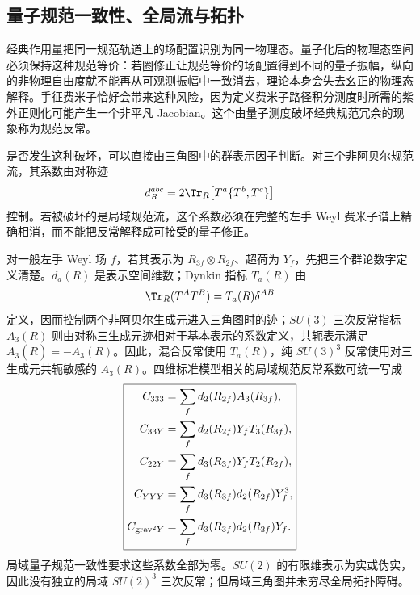 

\subsection{量子规范一致性、全局流与拓扑}\label{subsec:sm-gauge-anomaly-cancellation-dp32}

经典作用量把同一规范轨道上的场配置识别为同一物理态。量子化后的物理态空间必须保持这种规范等价：若圈修正让规范等价的场配置得到不同的量子振幅，纵向的非物理自由度就不能再从可观测振幅中一致消去，理论本身会失去幺正的物理态解释。手征费米子恰好会带来这种风险，因为定义费米子路径积分测度时所需的紫外正则化可能产生一个非平凡 Jacobian。这个由量子测度破坏经典规范冗余的现象称为规范反常。

\begin{definition}[手征规范反常的群论系数]
是否发生这种破坏，可以直接由三角图中的群表示因子判断。对三个非阿贝尔规范流，其系数由对称迹
\begin{equation*}
 d_R^{abc}=2\Tr_R\!\left[T^a\{T^b,T^c\}\right]
\end{equation*}
控制。若被破坏的是局域规范流，这个系数必须在完整的左手 Weyl 费米子谱上精确相消，而不能把反常解释成可接受的量子修正。

对一般左手 Weyl 场 $f$，若其表示为 $R_{3f}\otimes R_{2f}$、超荷为 $Y_f$，先把三个群论数字定义清楚。$d_a(R)$ 是表示空间维数；Dynkin 指标 $T_a(R)$ 由
\begin{equation*}
 \Tr_R(T^AT^B)=T_a(R)\delta^{AB}
\end{equation*}
定义，因而控制两个非阿贝尔生成元进入三角图时的迹；$SU(3)$ 三次反常指标 $A_3(R)$ 则由对称三生成元迹相对于基本表示的系数定义，共轭表示满足 $A_3(\bar R)=-A_3(R)$。因此，混合反常使用 $T_a(R)$，纯 $SU(3)^3$ 反常使用对三生成元共轭敏感的 $A_3(R)$。四维标准模型相关的局域规范反常系数可统一写成
\begin{equation}
\boxed{
\begin{aligned}
C_{333}&=\sum_f d_2(R_{2f})A_3(R_{3f}),\\
C_{33Y}&=\sum_f d_2(R_{2f})Y_fT_3(R_{3f}),\\
C_{22Y}&=\sum_f d_3(R_{3f})Y_fT_2(R_{2f}),\\
C_{YYY}&=\sum_f d_3(R_{3f})d_2(R_{2f})Y_f^3,\\
C_{{\rm grav}^2Y}&=\sum_f d_3(R_{3f})d_2(R_{2f})Y_f.
\end{aligned}}
\label{eq:general-chiral-anomaly-coefficients-dp75}
\end{equation}
局域量子规范一致性要求这些系数全部为零。$SU(2)$ 的有限维表示为实或伪实，因此没有独立的局域 $SU(2)^3$ 三次反常；但局域三角图并未穷尽全局拓扑障碍。
\end{definition}

